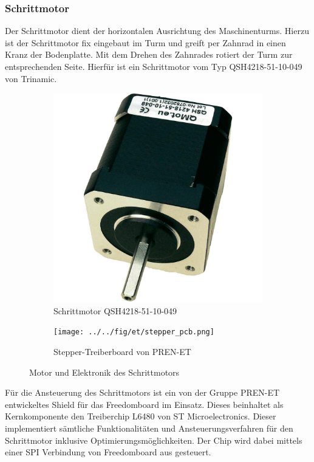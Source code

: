\subsubsection{Schrittmotor}
Der Schrittmotor dient der horizontalen Ausrichtung des Maschinenturms.
Hierzu ist der Schrittmotor fix eingebaut im Turm und greift per Zahnrad
in einen Kranz der Bodenplatte. Mit dem Drehen des Zahnrades rotiert der
Turm zur entsprechenden Seite. Hierfür ist ein Schrittmotor vom Typ 
QSH4218-51-10-049 von Trinamic.

\begin{figure}[h!]
	\centering
	\begin{subfigure}[b]{0.45\textwidth}
		\centering
		\includegraphics[width=1\textwidth]{../../fig/et/QSH4218-51-10-049.jpg}
		\caption{Schrittmotor QSH4218-51-10-049}
	\end{subfigure}
	\begin{subfigure}[b]{0.45\textwidth}
		\centering
		\texttt{[image: ../../fig/et/stepper\_pcb.png]}
		\caption{Stepper-Treiberboard von PREN-ET}
	\end{subfigure}
	\caption{Motor und Elektronik des Schrittmotors}
\end{figure}

Für die Ansteuerung des Schrittmotors ist ein von der Gruppe PREN-ET
entwickeltes Shield für das Freedomboard im Einsatz. Dieses beinhaltet
als Kernkomponente den Treiberchip L6480 von ST Microelectronics. Dieser
implementiert sämtliche Funktionalitäten und Ansteuerungsverfahren für den
Schrittmotor inklusive Optimierungsmöglichkeiten. Der Chip wird dabei
mittels einer SPI Verbindung von Freedomboard aus gesteuert.

